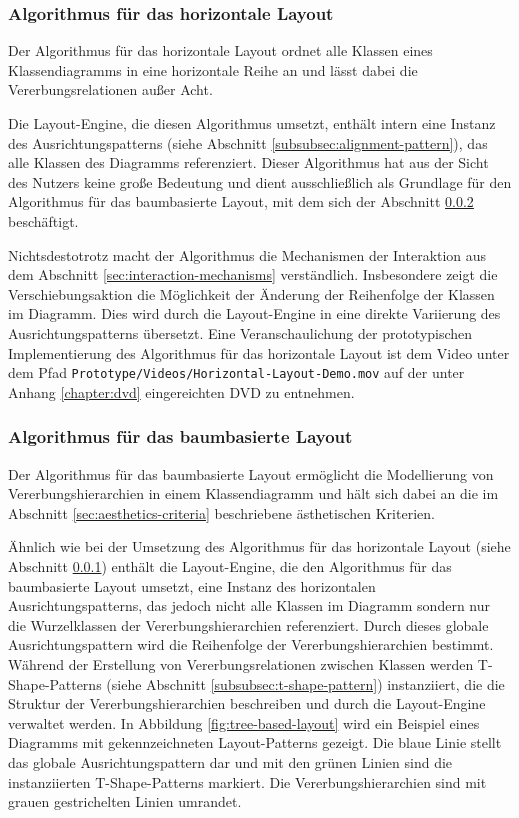 \subsubsection{Algorithmus für das horizontale Layout}
\label{subsubsec:horizontal-layout-algorithm}

Der Algorithmus für das horizontale Layout ordnet alle Klassen eines Klassendiagramms in eine horizontale Reihe an und lässt dabei die Vererbungsrelationen außer Acht.

Die Layout-Engine, die diesen Algorithmus umsetzt, enthält intern eine Instanz des Ausrichtungspatterns (siehe Abschnitt \ref{subsubsec:alignment-pattern}), das alle Klassen des Diagramms referenziert. Dieser Algorithmus hat aus der Sicht des Nutzers keine große Bedeutung und dient ausschließlich als Grundlage für den Algorithmus für das baumbasierte Layout, mit dem sich der Abschnitt \ref{subsubsec:tree-layout-algorithm} beschäftigt.

Nichtsdestotrotz macht der Algorithmus die Mechanismen der Interaktion aus dem Abschnitt \ref{sec:interaction-mechanisms} verständlich. Insbesondere zeigt die Verschiebungsaktion die Möglichkeit der Änderung der Reihenfolge der Klassen im Diagramm. Dies wird durch die Layout-Engine in eine direkte Variierung des Ausrichtungspatterns übersetzt. Eine Veranschaulichung der prototypischen Implementierung des Algorithmus für das horizontale Layout ist dem Video unter dem Pfad \texttt{Prototype/Videos/Hori\-zon\-tal-\-Lay\-out-\-De\-mo.mov} auf der unter Anhang \ref{chapter:dvd} eingereichten DVD zu entnehmen.

\subsubsection{Algorithmus für das baumbasierte Layout}
\label{subsubsec:tree-layout-algorithm}

Der Algorithmus für das baumbasierte Layout ermöglicht die Modellierung von Vererbungshierarchien in einem Klassendiagramm und hält sich dabei an die im Abschnitt \ref{sec:aesthetics-criteria} beschriebene ästhetischen Kriterien.

Ähnlich wie bei der Umsetzung des Algorithmus für das horizontale Layout (siehe Abschnitt \ref{subsubsec:horizontal-layout-algorithm}) enthält die Layout-Engine, die den Algorithmus für das baumbasierte Layout umsetzt, eine Instanz des horizontalen Ausrichtungspatterns, das jedoch nicht alle Klassen im Diagramm sondern nur die Wurzelklassen der Vererbungshierarchien referenziert. Durch dieses globale Ausrichtungspattern wird die Reihenfolge der Vererbungshierarchien bestimmt. Während der Erstellung von Vererbungsrelationen zwischen Klassen werden T-Shape-Patterns (siehe Abschnitt \ref{subsubsec:t-shape-pattern}) instanziiert, die die Struktur der Vererbungshierarchien beschreiben und durch die Layout-Engine verwaltet werden. In Abbildung \ref{fig:tree-based-layout} wird ein Beispiel eines Diagramms mit gekennzeichneten Layout-Patterns gezeigt. Die blaue Linie stellt das globale Ausrichtungspattern dar und mit den grünen Linien sind die instanziierten T-Shape-Patterns markiert. Die Vererbungshierarchien sind mit grauen gestrichelten Linien umrandet.

